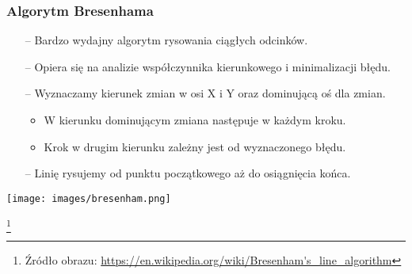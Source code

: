 \documentclass[usenames,dvipsnames,aspectratio=43,presentation]{beamer}
\begin{document}
    \begin{frame}
        \frametitle{Algorytm Bresenhama}
        \footnotesize

        \begin{itemize}
            \setlength{\itemsep}{-0.1em}
            \item[--] Bardzo wydajny algorytm rysowania ciągłych odcinków.
            \item[--] Opiera się na analizie współczynnika kierunkowego i minimalizacji błędu.
            \item[--] Wyznaczamy kierunek zmian w osi X i Y oraz dominującą oś dla zmian.
                      \begin{itemize}
                          \setlength{\itemsep}{0.1em}
                          \scriptsize
                          \item W kierunku dominującym zmiana następuje w każdym kroku.
                          \item Krok w drugim kierunku zależny jest od wyznaczonego błędu.
                      \end{itemize}
            \item[--] Linię rysujemy od punktu początkowego aż do osiągnięcia końca.
        \end{itemize}

        \vfill

        \begin{minipage}{\textwidth}
            \centering

            \texttt{[image: images/bresenham.png]}
        \end{minipage}

        \let\thefootnote\relax\footnote[frame]{
            \tiny
            \hspace{-3.25em}
            Źródło obrazu:
            \url{https://en.wikipedia.org/wiki/Bresenham's_line_algorithm}
        }
    \end{frame}
\end{document}

